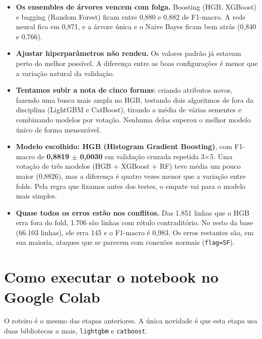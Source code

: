 \documentclass[11pt,a4paper]{article}
\begin{document}
\begin{itemize}
\item \textbf{Os ensembles de árvores vencem com folga.} Boosting (HGB, XGBoost) e bagging (Random Forest) ficam entre 0,880 e 0,882 de F1-macro. A rede neural fica em 0,871, e a árvore única e o Naive Bayes ficam bem atrás (0,840 e 0,766).
\item \textbf{Ajustar hiperparâmetros não rendeu.} Os valores padrão já estavam perto do melhor possível. A diferença entre as boas configurações é menor que a variação natural da validação.
\item \textbf{Tentamos subir a nota de cinco formas}: criando atributos novos, fazendo uma busca mais ampla no HGB, testando dois algoritmos de fora da disciplina (LightGBM e CatBoost), tirando a média de várias sementes e combinando modelos por votação. Nenhuma delas superou o melhor modelo único de forma mensurável.
\item \textbf{Modelo escolhido: HGB (Histogram Gradient Boosting)}, com F1-macro de \textbf{0,8819 $\pm$ 0,0030} em validação cruzada repetida 3$\times$5. Uma votação de três modelos (HGB + XGBoost + RF) teve média um pouco maior (0,8826), mas a diferença é quatro vezes menor que a variação entre folds. Pela regra que fixamos antes dos testes, o empate vai para o modelo mais simples.
\item \textbf{Quase todos os erros estão nos conflitos.} Das 1.851 linhas que o HGB erra fora do fold, 1.706 são linhas com rótulo contraditório. No resto da base (66.103 linhas), ele erra 145 e o F1-macro é 0,983. Os erros restantes são, em sua maioria, ataques que se parecem com conexões normais (\texttt{flag=SF}).
\end{itemize}

\section*{Como executar o notebook no Google Colab}

O roteiro é o mesmo das etapas anteriores. A única novidade é que esta etapa usa duas bibliotecas a mais, \texttt{lightgbm} e \texttt{catboost}.

\begin{center}\end{center}
\end{document}
